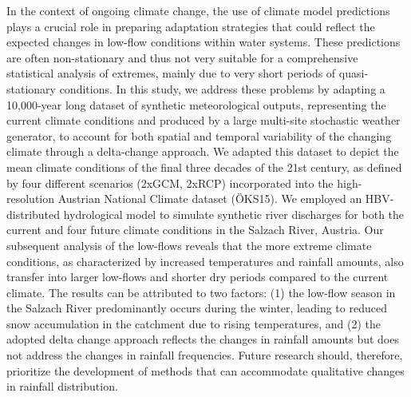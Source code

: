 \noindent

In the context of ongoing climate change, the use of climate model predictions plays a crucial role in preparing adaptation strategies that could reflect the expected changes in low-flow conditions within water systems. These predictions are often non-stationary and thus not very suitable for a comprehensive statistical analysis of extremes, mainly due to very short periods of quasi-stationary conditions. In this study, we address these problems by adapting a 10,000-year long dataset of synthetic meteorological outputs, representing the current climate conditions and produced by a large multi-site stochastic weather generator, to account for both spatial and temporal variability of the changing climate through a delta-change approach. We adapted this dataset to depict the mean climate conditions of the final three decades of the 21st century, as defined by four different scenarios (2xGCM, 2xRCP) incorporated into the high-resolution Austrian National Climate dataset (ÖKS15). We employed an HBV-distributed hydrological model to simulate synthetic river discharges for both the current and four future climate conditions in the Salzach River, Austria. Our subsequent analysis of the low-flows reveals that the more extreme climate conditions, as characterized by increased temperatures and rainfall amounts, also transfer into larger low-flows and shorter dry periods compared to the current climate. The results can be attributed to two factors: (1) the low-flow season in the Salzach River predominantly occurs during the winter, leading to reduced snow accumulation in the catchment due to rising temperatures, and (2) the adopted delta change approach reflects the changes in rainfall amounts but does not address the changes in rainfall frequencies. Future research should, therefore, prioritize the development of methods that can accommodate qualitative changes in rainfall distribution.



\newpage{}
{}
\begin{flushleft}





\end{flushleft}


